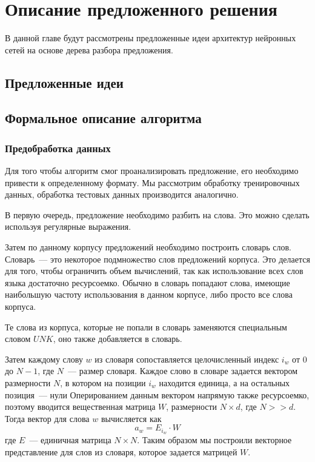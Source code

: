 
\chapter{Описание предложенного решения}

В данной главе будут рассмотрены предложенные идеи архитектур нейронных сетей на основе дерева разбора предложения.


\section{Предложенные идеи}


\section{Формальное описание алгоритма}

\subsection{Предобработка данных}
Для того чтобы алгоритм смог проанализировать предложение, 
его необходимо привести к определенному формату. Мы рассмотрим обработку
тренировочных данных, обработка тестовых данных производится аналогично.

В первую очередь, предложение необходимо разбить на слова. 
Это можно сделать используя регулярные выражения. 

Затем по данному корпусу предложений необходимо построить словарь слов.
Словарь~--- это некоторое подмножество слов предложений корпуса.
Это делается для того, чтобы ограничить объем вычислений, так как использование всех
слов языка достаточно ресурсоемко. Обычно в словарь попадают слова, 
имеющие наибольшую частоту использования в данном корпусе, 
либо просто все слова корпуса.

Те слова из корпуса, которые не попали в словарь заменяются специальным словом $UNK$, 
оно также добавляется в словарь.

Затем каждому слову $w$ из словаря сопоставляется целочисленный индекс $i_w$ 
от $0$ до $N-1$, где $N$~--- размер словаря.
Каждое слово в словаре задается вектором размерности $N$, 
в котором на позиции $i_w$ находится единица, а на остальных позиция~--- нули
Оперированием данным вектором напрямую также ресурсоемко, поэтому вводится вещественная матрица $W$, 
размерности $N \times d$, где $N >> d$. Тогда вектор для слова $w$ вычисляется как
$$a_w = E_{i_w} \cdot W$$
где $E$~--- единичная матрица $N \times N$.
Таким образом мы построили векторное представление для слов из словаря, которое задается матрицей $W$.

